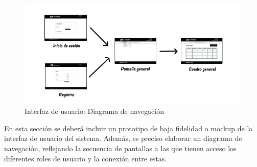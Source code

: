 \begin{figure}[h!]
\centering
  \includegraphics[scale=.55]{img/interfaz/navegacion.jpg}
  \caption{Interfaz de usuario: Diagrama de navegación}
  \label{fig:interfaz-navegacion}
\end{figure}


En esta sección se deberá incluir un prototipo de baja fidelidad o mockup de la interfaz de usuario del sistema. Además, es preciso elaborar un diagrama de navegación, reflejando la secuencia de pantallas a las que tienen acceso los diferentes roles de usuario y la conexión entre estas.



